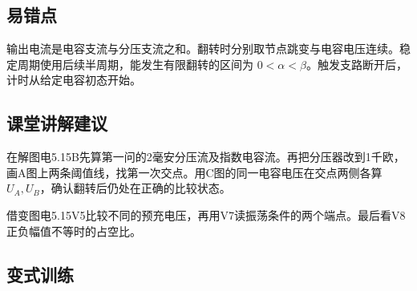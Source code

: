 \documentclass[UTF8,fontset=fandol,a4paper,11pt]{ctexart}
\begin{document}

\subsection*{易错点}

输出电流是电容支流与分压支流之和。翻转时分别取节点跳变与电容电压连续。稳定周期使用后续半周期，能发生有限翻转的区间为 $0<\alpha<\beta$。触发支路断开后，计时从给定电容初态开始。



\subsection*{课堂讲解建议}

在解图电5.15B先算第一问的2毫安分压流及指数电容流。再把分压器改到1千欧，画A图上两条阈值线，找第一次交点。用C图的同一电容电压在交点两侧各算 $U_A,U_B$，确认翻转后仍处在正确的比较状态。

借变图电5.15V5比较不同的预充电压，再用V7读振荡条件的两个端点。最后看V8正负幅值不等时的占空比。


\subsection*{变式训练}
\end{document}
